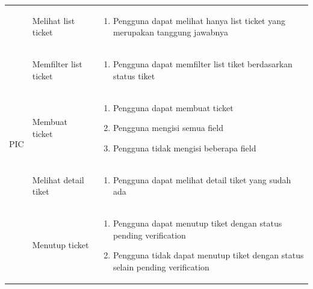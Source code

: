 \documentclass[12pt]{article}
\begin{document}
\begin{enumerate}[label=\textbf{5.\arabic*.}]
\begin{enumerate}[label=\textbf{5.2.\arabic*.}]
\begin{longtable}{ |l|l|p{}| }
            \multirow{7}{*}{PIC} & Melihat list ticket     & \begin{enumerate}[label=\arabic*.] 
                                                                \item Pengguna dapat melihat hanya list ticket yang merupakan tanggung jawabnya 
                                                            \end{enumerate}\\\cline{2-3}
                                & Memfilter list ticket & \begin{enumerate}[label=\arabic*.]
                                                                \item Pengguna dapat memfilter list tiket berdasarkan status tiket  
                                                            \end{enumerate}\\\cline{2-3}
                                & Membuat ticket  & \begin{enumerate}[label=\arabic*.]
                                                                \item Pengguna dapat membuat ticket
                                                                \item Pengguna mengisi semua field
                                                                \item Pengguna tidak mengisi beberapa field
                                                            \end{enumerate}\\\cline{2-3}
                                & Melihat detail tiket  & \begin{enumerate}[label=\arabic*.]
                                                                \item Pengguna dapat melihat detail tiket yang sudah ada 
                                                            \end{enumerate}\\\cline{2-3}
                                & Menutup ticket        & \begin{enumerate}[label=\arabic*.]
                                                                \item Pengguna dapat menutup tiket dengan status pending verification
                                                                \item Pengguna tidak dapat menutup tiket dengan status selain pending verification

\end{enumerate}
\end{longtable}
\end{enumerate}
\end{enumerate}
\end{document}
